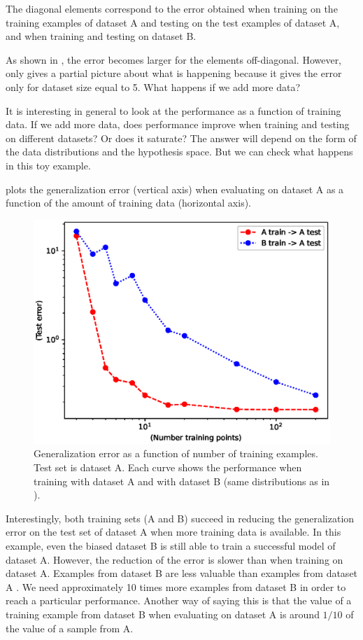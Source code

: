 The diagonal elements correspond to the error obtained when training on the training examples of dataset A and testing on the test examples of dataset A, and when training and testing on dataset B.  

As shown in \tab{\ref{table:bias_and_shift:training_test_sets}}, the error becomes larger for the elements off-diagonal. However, \tab{\ref{table:bias_and_shift:training_test_sets}} only gives a partial picture about what is happening because it gives the error only for dataset size equal to 5. What happens if we add more data? 

It is interesting in general to look at the performance as a function of training data. If we add more data, does performance improve when training and testing on different datasets? Or does it saturate? The answer will depend on the form of the data distributions and the hypothesis space. But we can check what happens in this toy example. 

\Fig{\ref{fig:bias_and_shift:test_as_function_of_data}} plots the generalization error (vertical axis) when evaluating on dataset A as a function of the amount of training data (horizontal axis). 


\begin{figure}[h!]
    \centerline{
    \includegraphics[width=0.6\linewidth]{figures/bias_and_shift/toy_example/test_as_function_of_data.eps}
    }
    \caption{Generalization error as a function of number of training examples. Test set is dataset A. Each curve shows the performance when training with dataset A and with dataset B (same distributions as in \fig{\ref{fig:bias_and_shift:training_test_sets}}).}
    \label{fig:bias_and_shift:test_as_function_of_data}
\end{figure}


Interestingly, both training sets (A and B) succeed in reducing the generalization error on the test set of dataset A when more training data is available. In this example, even the biased dataset B is still able to train a successful model of dataset A. However, the reduction of the error is slower than when training on dataset A. Examples from dataset B are less valuable than examples from dataset A \cite{Torralba2011}. We need approximately 10 times more examples from dataset B in order to reach a particular performance. Another way of saying this is that the value of a training example from dataset B when evaluating on dataset A is around $1/10$ of the value of a sample from A.

